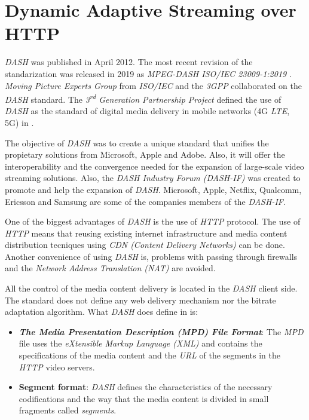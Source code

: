 \section{Dynamic Adaptive Streaming over HTTP}
\label{sec:dash}

\textit{DASH} was published in April 2012. 
The most recent revision of the standarization was released in 2019 as 
\textit{MPEG-DASH ISO/IEC 23009-1:2019} \cite{ISO23009}. 
 \textit{Moving Picture Experts Group} from \textit{ISO/IEC} and the \textit{3GPP} collaborated on
the \textit{DASH} standard. The \textit{3\textsuperscript{rd} Generation Partnership Project} defined the use of
\textit{DASH} as the standard of digital media delivery in mobile networks (4G \textit{LTE}, 5G) in \cite{3gpp1}.

The objective of \textit{DASH} was to create a unique standard that unifies the propietary solutions
from Microsoft, Apple and Adobe. Also, it will offer the interoperability and the convergence needed for 
the expansion of large-scale video streaming solutions. Also, the \textit{DASH Industry Forum (DASH-IF)} was created to promote and help the expansion of
\textit{DASH}. Microsoft, Apple, Netflix, Qualcomm, Ericsson and Samsung are some of the companies
members of the \textit{DASH-IF}.

One of the biggest advantages of \textit{DASH} is the use of \textit{HTTP} protocol.
The use of \textit{HTTP} means that reusing existing internet infrastructure and
media content distribution tecniques using \textit{CDN (Content Delivery Networks)} can be done.
Another convenience of using \textit{DASH} is, problems
with passing through firewalls and the \textit{Network Address Translation (NAT)}
are avoided.

All the control of the media content delivery is located in the \textit{DASH} client side. The
standard does not define any web delivery mechanism nor the bitrate adaptation algorithm. What \textit{DASH}
does define in \cite{ISO23009} is:

\begin{itemize}
  \item \textit{\textbf{The Media Presentation Description (MPD) File Format}}: The \textit{MPD} file
  uses the \textit{eXtensible Markup Language (XML)} and
  contains the specifications of the media content and the \textit{URL} of the segments
  in the \textit{HTTP} video servers.
  \item \textbf{Segment format}: \textit{DASH} defines the characteristics of the necessary
  codifications and the way that the media content is divided in small fragments called 
  \textit{segments}.
\end{itemize}


